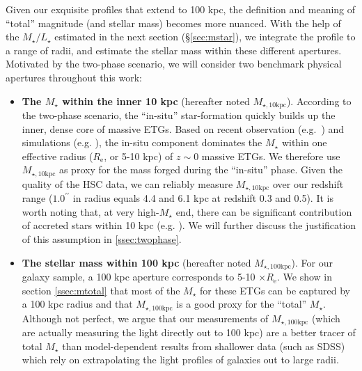 \documentclass[a4paper,fleqn,usenatbib]{mnras}
\def\arcsec{{\prime\prime}}
\def\mstar{{$M_{\star}$}}
\def\minn{{$M_{\star,10\mathrm{kpc}}$}}
\def\mtot{{$M_{\star,100\mathrm{kpc}}$}}
\def\m2l{{$M_{\star}/L_{\star}$}}
\begin{document}
    Given our exquisite profiles that extend to 100 kpc, the definition and meaning 
    of ``total'' magnitude (and stellar mass) becomes more nuanced.
    With the help of the \m2l{} estimated in the next section (\S \ref{sec:mstar}), 
    we integrate the profile to a range of radii, and estimate the stellar mass 
    within these different apertures.  
    Motivated by the two-phase scenario, we will consider two benchmark physical 
    apertures throughout this work:
    
    \begin{itemize} 
       
        \item \textbf{The \mstar{} within the inner 10 kpc} 
            (hereafter noted \minn{}). 
            According to the two-phase scenario, the ``in-situ'' star-formation 
            quickly builds up the inner, dense core of massive ETGs.  
            Based on recent observation (e.g.~\citealt{vanDokkum2010}) and 
            simulations (e.g. \citealt{RodriguezGomez2016}), the in-situ component
            dominates the \mstar{} within one effective radius ($R_{\mathrm{e}}$, 
            or 5-10 kpc) of $z{\sim}0$ massive ETGs.
            We therefore use \minn{} as proxy for the mass forged during the 
            ``in-situ'' phase. 
            Given the quality of the HSC data, we can reliably measure \minn{} over 
            our redshift range ($1.0^{\arcsec}$ in radius equals 4.4 and 6.1 kpc 
            at redshift 0.3 and 0.5).  
            It is worth noting that, at very high-\mstar{} end, there can be 
            significant contribution of accreted stars within 10 kpc 
            (e.g. \citealt{RodriguezGomez2016}). 
            We will further discuss the justification of this assumption in 
            \ref{ssec:twophase}.
            
        \item \textbf{The stellar mass within 100 kpc} 
            (hereafter noted \mtot{}). 
            For our galaxy sample, a 100 kpc aperture corresponds to 5-10 
            $\times R_{\mathrm{e}}$. 
            We show in section \ref{ssec:mtotal} that most of the \mstar{} for 
            these ETGs can be captured by a 100 kpc radius and that \mtot{} is 
            a good proxy for the ``total'' \mstar{}. 
            Although not perfect, we argue that our measurements of \mtot{} (which are 
            actually measuring the light directly out to 100 kpc) are a better tracer 
            of total \mstar{} than model-dependent results from shallower data 
            (such as SDSS) which rely on extrapolating the light profiles of galaxies 
            out to large radii.
            
       \end{itemize}
       
\end{document}
